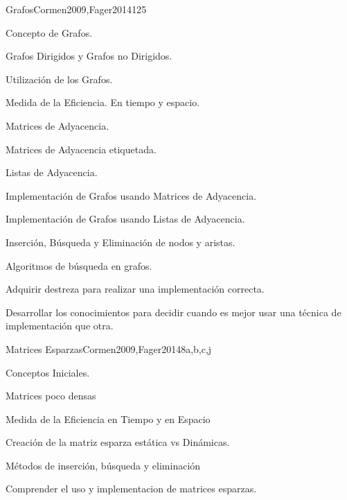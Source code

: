 \begin{syllabus}
\begin{unit}{Grafos}{}{Cormen2009,Fager2014}{12}{5}
   \begin{topics}
    \item Concepto de Grafos.
    \item Grafos Dirigidos y Grafos no Dirigidos.
    \item Utilización de los Grafos.
    \item Medida de la Eficiencia. En tiempo y espacio.
    \item Matrices de Adyacencia.
    \item Matrices de Adyacencia etiquetada.
    \item Listas de Adyacencia.
    \item Implementación de Grafos usando Matrices de Adyacencia.
    \item Implementación de Grafos usando Listas de Adyacencia.
    \item Inserción, Búsqueda y Eliminación de nodos y aristas.
    \item Algoritmos de búsqueda en grafos.
   \end{topics}
   \begin{learningoutcomes}
      \item  Adquirir destreza para realizar una implementación correcta.
      \item  Desarrollar los conocimientos para decidir cuando es mejor usar una técnica de implementación que otra.
   \end{learningoutcomes}
\end{unit}

\begin{unit}{Matrices Esparzas}{}{Cormen2009,Fager2014}{8}{a,b,c,j}
   \begin{topics}
    \item  Conceptos  Iniciales.
    \item  Matrices poco densas
    \item  Medida de la Eficiencia en Tiempo  y en Espacio
    \item  Creación de la matriz esparza estática vs Dinámicas.
    \item  Métodos de inserción, búsqueda y eliminación
   \end{topics}

\begin{learningoutcomes}
      \item Comprender el uso y implementacion de matrices esparzas.
   \end{learningoutcomes}
\end{unit}


\end{syllabus}
